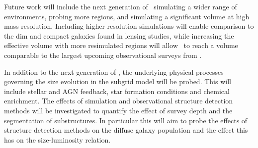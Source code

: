 Future work will include the next generation of \flares\ simulating a wider range of environments, probing more regions, and simulating a significant volume at high mass resolution. Including higher resolution simulations will enable comparison to the dim and compact galaxies found in lensing studies, while increasing the effective volume with more resimulated regions will allow \flares\ to reach a volume comparable to the largest upcoming observational surveys from \euclid.   

In addition to the next generation of \flares, the underlying physical processes governing the size evolution in the subgrid model will be probed. This will include stellar and AGN feedback, star formation conditions and chemical enrichment. The effects of simulation and observational structure detection methods will be investigated to quantify the effect of survey depth and the segmentation of substructures. In particular this will aim to probe the effects of structure detection methods on the diffuse galaxy population and the effect this has on the size-luminosity relation.
